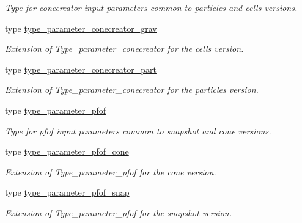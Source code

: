 \begin{DoxyCompactItemize}
\begin{DoxyCompactList}\small\item\em Type for conecreator input parameters common to particles and cells versions. \end{DoxyCompactList}\item 
type \hyperlink{structmodconstant_1_1type__parameter__conecreator__grav}{type\-\_\-parameter\-\_\-conecreator\-\_\-grav}
\begin{DoxyCompactList}\small\item\em Extension of Type\-\_\-parameter\-\_\-conecreator for the cells version. \end{DoxyCompactList}\item 
type \hyperlink{structmodconstant_1_1type__parameter__conecreator__part}{type\-\_\-parameter\-\_\-conecreator\-\_\-part}
\begin{DoxyCompactList}\small\item\em Extension of Type\-\_\-parameter\-\_\-conecreator for the particles version. \end{DoxyCompactList}\item 
type \hyperlink{structmodconstant_1_1type__parameter__pfof}{type\-\_\-parameter\-\_\-pfof}
\begin{DoxyCompactList}\small\item\em Type for pfof input parameters common to snapshot and cone versions. \end{DoxyCompactList}\item 
type \hyperlink{structmodconstant_1_1type__parameter__pfof__cone}{type\-\_\-parameter\-\_\-pfof\-\_\-cone}
\begin{DoxyCompactList}\small\item\em Extension of Type\-\_\-parameter\-\_\-pfof for the cone version. \end{DoxyCompactList}\item 
type \hyperlink{structmodconstant_1_1type__parameter__pfof__snap}{type\-\_\-parameter\-\_\-pfof\-\_\-snap}
\begin{DoxyCompactList}\small\item\em Extension of Type\-\_\-parameter\-\_\-pfof for the snapshot version. \end{DoxyCompactList}\end{DoxyCompactItemize}
